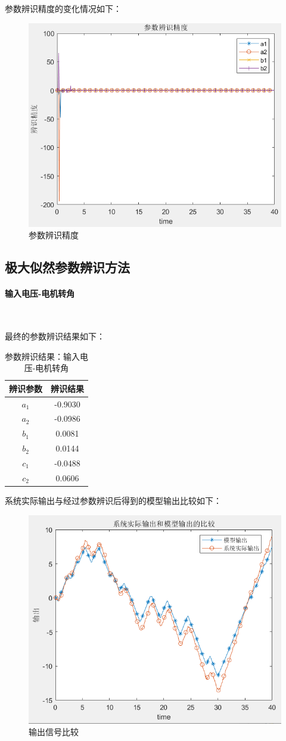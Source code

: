 \documentclass[UTF8, twocolumn]{article}
\begin{document}
参数辨识精度的变化情况如下：
\begin{figure}[H]
    \centering %
    \includegraphics[width=.4\textwidth]{figure/最小二乘-电机转速-参数辨识精度.png} 
    \caption{参数辨识精度} %
\end{figure}


\subsection{极大似然参数辨识方法}
\paragraph{输入电压-电机转角}~{}

最终的参数辨识结果如下：
\begin{table}[H] %
\centering %
\begin{tabular}{cc} %
	\toprule %
	辨识参数 & 辨识结果 \\
	\midrule %
	$a_1$ & -0.9030 \\
	$a_2$ & -0.0986 \\
	$b_1$ &  0.0081	\\
	$b_2$ & 0.0144 \\
	$c_1$ & -0.0488 \\
    $c_2$ & 0.0606 \\
	\bottomrule %
\end{tabular}
\caption{参数辨识结果：输入电压-电机转角} %
\end{table}

系统实际输出与经过参数辨识后得到的模型输出比较如下：
\begin{figure}[H]
    \centering %
    \includegraphics[width=.4\textwidth]{figure/极大似然-电机转角-输出比较.png} 
    \caption{输出信号比较} %
\end{figure}
\end{document}
